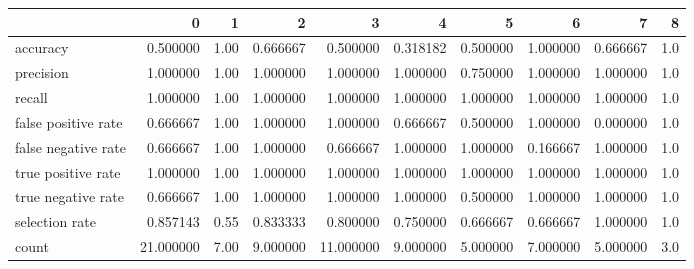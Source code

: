 \begin{tabular}{lrrrrrrrrr}
\toprule
{} &          0 &     1 &         2 &          3 &         4 &         5 &         6 &         7 &    8 \\
\midrule
accuracy            &   0.500000 &  1.00 &  0.666667 &   0.500000 &  0.318182 &  0.500000 &  1.000000 &  0.666667 &  1.0 \\
precision           &   1.000000 &  1.00 &  1.000000 &   1.000000 &  1.000000 &  0.750000 &  1.000000 &  1.000000 &  1.0 \\
recall              &   1.000000 &  1.00 &  1.000000 &   1.000000 &  1.000000 &  1.000000 &  1.000000 &  1.000000 &  1.0 \\
false positive rate &   0.666667 &  1.00 &  1.000000 &   1.000000 &  0.666667 &  0.500000 &  1.000000 &  0.000000 &  1.0 \\
false negative rate &   0.666667 &  1.00 &  1.000000 &   0.666667 &  1.000000 &  1.000000 &  0.166667 &  1.000000 &  1.0 \\
true positive rate  &   1.000000 &  1.00 &  1.000000 &   1.000000 &  1.000000 &  1.000000 &  1.000000 &  1.000000 &  1.0 \\
true negative rate  &   0.666667 &  1.00 &  1.000000 &   1.000000 &  1.000000 &  0.500000 &  1.000000 &  1.000000 &  1.0 \\
selection rate      &   0.857143 &  0.55 &  0.833333 &   0.800000 &  0.750000 &  0.666667 &  0.666667 &  1.000000 &  1.0 \\
count               &  21.000000 &  7.00 &  9.000000 &  11.000000 &  9.000000 &  5.000000 &  7.000000 &  5.000000 &  3.0 \\
\bottomrule
\end{tabular}
